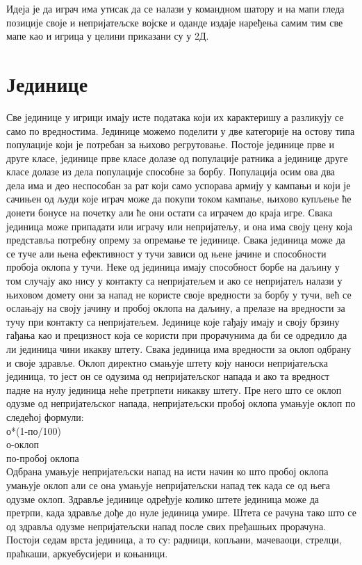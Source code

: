 \documentclass[11pt,a4paper]{report}
\begin{document}
Идеја је да играч има утисак да се налази у командном шатору и на мапи гледа позиције своје и непријатељске војске и оданде издаје наређења самим тим све мапе као и игрица у целини приказани су у 2Д.

\section{Јединице}
Све јединице у игрици имају исте података који их карактеришу а разликују се само по вредностима. Јединице можемо поделити у две категорије на остову типа популације који је потребан за њихово регрутовање. Постоје јединице прве и друге класе, јединице прве класе долазе од популације ратника а јединице друге класе долазе из дела популације способне за борбу. Популација осим ова два дела има и део неспособан за рат који само успорава армију у кампањи и који је сачињен од људи које играч може да покупи током кампање, њихово купљење ће донети бонусе на почетку али ће они остати са играчем до краја игре. Свака јединица може припадати или играчу или непријатељу, и она има своју цену која представља потребну опрему за опремање те јединице. Свака јединица може да се туче али њена ефективност у тучи зависи од њене јачине и способности пробоја оклопа у тучи. Неке од јединица имају способност борбе на даљину у том случају ако нису у контакту са непријатељем и ако се непријатељ налази у њиховом домету они за напад не користе своје вредности за борбу у тучи, већ се ослањају на своју јачину и пробој оклопа на даљину, а прелазе на вредности за тучу при контакту са непријатељем. Јединице које гађају имају и своју брзину гађања као и прецизност која се користи при прорачунима да би се одредило да ли јединица чини икакву штету. Свака јединица има вредности за оклоп одбрану и своје здравље. Оклоп директно смањује штету коју наноси непријатељска јединица, то јест он се одузима од непријатељског напада и ако та вредност падне на нулу јединица неће претрпети никакву штету. Пре него што се оклоп одузме од непријатељског напада, непријатељски пробој оклопа умањује оклоп по следећој формули:
\\ о*(1-по/100)
\\ о-оклоп 
\\ по-пробој оклопа
\\ Одбрана умањује непријатељски напад на исти начин ко што пробој оклопа умањује оклоп али се она умањује непријатељски напад тек када се од њега одузме оклоп. Здравље јединице одређује колико штете јединица може да претрпи, када здравље дође до нуле јединица умире. Штета се рачуна тако што се од здравља одузме непријатељски напад после свих пређашњих прорачуна. Постоји седам врста јединица, а то су: радници, копљани, мачеваоци, стрелци, праћкаши, аркуебусијери и коњаници.
\end{document}
